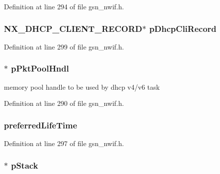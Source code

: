 Definition at line 294 of file gsn\_\-nwif.h.

\hypertarget{a00168_a1c88ca9d05b135f0b9c642340acd8861}{
\subsubsection[{pDhcpCliRecord}]{\setlength{\rightskip}{0pt plus 5cm}NX\_\-DHCP\_\-CLIENT\_\-RECORD$\ast$ {\bf pDhcpCliRecord}}}
\label{a00168_a1c88ca9d05b135f0b9c642340acd8861}


Definition at line 299 of file gsn\_\-nwif.h.

\hypertarget{a00168_a4dd138b425ca3a4d78a87043bc7e8029}{
\subsubsection[{pPktPoolHndl}]{$\ast$ {\bf pPktPoolHndl}}}
\label{a00168_a4dd138b425ca3a4d78a87043bc7e8029}
memory pool handle to be used by dhcp v4/v6 task 

Definition at line 290 of file gsn\_\-nwif.h.

\hypertarget{a00168_adc053e52c63bf49419525d7c9a089aea}{
\subsubsection[{preferredLifeTime}]{ {\bf preferredLifeTime}}}
\label{a00168_adc053e52c63bf49419525d7c9a089aea}


Definition at line 297 of file gsn\_\-nwif.h.

\hypertarget{a00168_ad576950ba372f7a10189812ba4e2de3a}{
\subsubsection[{pStack}]{$\ast$ {\bf pStack}}}
\label{a00168_ad576950ba372f7a10189812ba4e2de3a}


